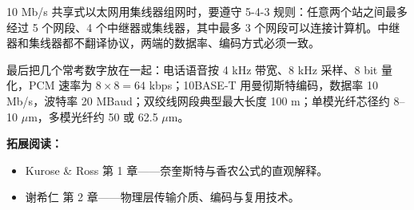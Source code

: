 10 Mb/s 共享式以太网用集线器组网时，要遵守 5-4-3 规则：任意两个站之间最多经过 5 个网段、4 个中继器或集线器，其中最多 3 个网段可以连接计算机。中继器和集线器都不翻译协议，两端的数据率、编码方式必须一致。

最后把几个常考数字放在一起：电话语音按 4 kHz 带宽、8 kHz 采样、8 bit 量化，PCM 速率为 $8\times8=64$ kbps；10BASE-T 用曼彻斯特编码，数据率 10 Mb/s，波特率 20 MBaud；双绞线网段典型最大长度 100 m；单模光纤芯径约 8--10 $\mu$m，多模光纤约 50 或 62.5 $\mu$m。

\newpage

\noindent\textbf{拓展阅读：}
\begin{itemize}
    \item Kurose \& Ross 第 1 章——奈奎斯特与香农公式的直观解释。
    \item 谢希仁 第 2 章——物理层传输介质、编码与复用技术。
\end{itemize}
